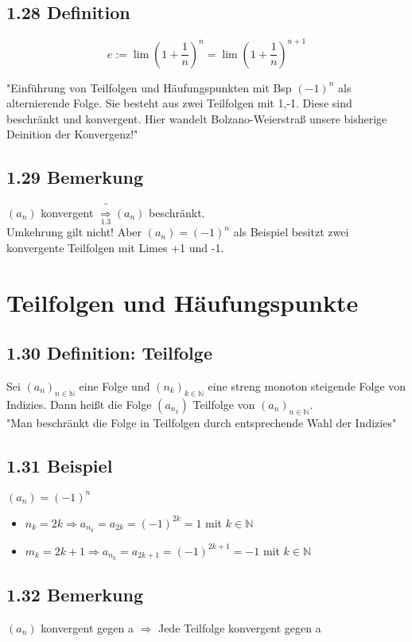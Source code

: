 \documentclass[12pt]{article}
\begin{document}
\subsection*{1.28 Definition}

$$e := \lim (1+\frac{1}{n})^n = \lim (1+\frac{1}{n})^{n+1}$$

"Einführung von Teilfolgen und Häufungspunkten mit Bsp $(-1)^n$ als alternierende Folge. Sie besteht aus zwei Teilfolgen mit 1,-1. Diese sind beschränkt und konvergent. Hier wandelt Bolzano-Weierstraß unsere bisherige Deinition der Konvergenz!"


\subsection*{1.29 Bemerkung}
$(a_n)$ konvergent $\overbrace{\Rightarrow}_{1.3} (a_n)$ beschränkt. \\
Umkehrung gilt nicht! Aber $(a_n)=(-1)^n$ als Beispiel besitzt zwei konvergente Teilfolgen mit Limes +1 und -1. 

\section*{Teilfolgen und Häufungspunkte}

\subsection*{1.30 Definition: Teilfolge}
Sei $(a_n)_{n \in \mathbb{N}}$ eine Folge und $(n_k)_{k \in \mathbb{N}}$ eine streng monoton steigende Folge von Indizies. Dann heißt die Folge $(a_{n_k})$ Teilfolge von  $(a_n)_{n \in \mathbb{N}}$.\\
"Man beschränkt die Folge in Teilfolgen durch entsprechende Wahl der Indizies"


\subsection*{1.31 Beispiel}
$(a_n)=(-1)^n$
\begin{itemize}
	\item $n_k = 2k \Rightarrow a_{n_k} = a_{2k} = (-1)^{2k} = 1$ mit $k \in \mathbb{N}$\\
	\item $m_k = 2k+1 \Rightarrow a_{n_k} = a_{2k+1} = (-1)^{2k+1}= -1 $ mit  $k \in \mathbb{N}$
\end{itemize}


\subsection*{1.32 Bemerkung}
$(a_n) $ konvergent gegen a $\Rightarrow $ Jede Teilfolge konvergent gegen a
\end{document}

